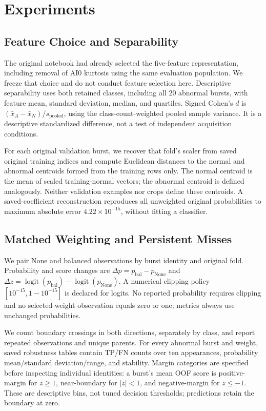 \documentclass[10pt,twocolumn,letterpaper]{article}
\begin{document}
\section{Experiments}
\subsection{Feature Choice and Separability}
The original notebook had already selected the five-feature representation, including removal of AI0 kurtosis using the same evaluation population. We freeze that choice and do not conduct feature selection here. Descriptive separability uses both retained classes, including all 20 abnormal bursts, with feature mean, standard deviation, median, and quartiles. Signed Cohen's $d$ is $(\bar{x}_A-\bar{x}_N)/s_{\mathrm{pooled}}$, using the class-count-weighted pooled sample variance. It is a descriptive standardized difference, not a test of independent acquisition conditions.

For each original validation burst, we recover that fold's scaler from saved original training indices and compute Euclidean distances to the normal and abnormal centroids formed from the training rows only. The normal centroid is the mean of scaled training-normal vectors; the abnormal centroid is defined analogously. Neither validation examples nor crops define these centroids. A saved-coefficient reconstruction reproduces all unweighted original probabilities to maximum absolute error $4.22\times10^{-15}$, without fitting a classifier.

\subsection{Matched Weighting and Persistent Misses}
We pair None and balanced observations by burst identity and original fold. Probability and score changes are $\Delta p=p_{\mathrm{bal}}-p_{\mathrm{None}}$ and $\Delta z=\operatorname{logit}(p_{\mathrm{bal}})-\operatorname{logit}(p_{\mathrm{None}})$. A numerical clipping policy $[10^{-15},1-10^{-15}]$ is declared for logits. No reported probability requires clipping and no selected-weight observation equals zero or one; metrics always use unchanged probabilities.

We count boundary crossings in both directions, separately by class, and report repeated observations and unique parents. For every abnormal burst and weight, saved robustness tables contain TP/FN counts over ten appearances, probability mean/standard deviation/range, and stability. Margin categories are specified before inspecting individual identities: a burst's mean OOF score is positive-margin for $\bar z\geq1$, near-boundary for $|\bar z|<1$, and negative-margin for $\bar z\leq-1$. These are descriptive bins, not tuned decision thresholds; predictions retain the boundary at zero.
\end{document}
